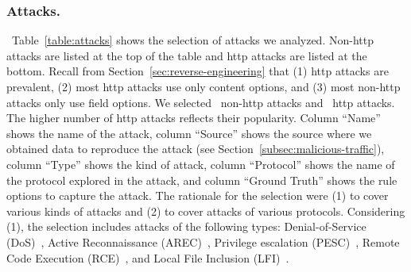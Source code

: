 \documentclass[sigconf,review, anonymous]{acmart}
\begin{document}
\subsubsection{Attacks.}~Table~\ref{table:attacks} shows the selection
of attacks we analyzed.  Non-http attacks are listed at the top of the
table and http attacks are listed at the bottom. Recall from
Section~\ref{sec:reverse-engineering} that (1) http attacks are
prevalent, (2) most http attacks use only content options, and (3)
most non-http attacks only use field options. We selected
\numNonContentAttacks\ non-http attacks and \numContentAttacks\ http
attacks. The higher number of http attacks reflects their
popularity. Column ``Name'' shows the name of the attack, column
``Source'' shows the source where we obtained data to reproduce the
attack (see Section~\ref{subsec:malicious-traffic}), column ``Type''
shows the kind of attack, column ``Protocol'' shows the name of the
protocol explored in the attack, and column ``Ground Truth'' shows the
rule options to capture the attack. The rationale for the selection
were (1) to cover various kinds of attacks and (2) to cover attacks of
various protocols. Considering (1), the selection includes attacks of
the following types: Denial-of-Service (DoS)~\cite{denial-of-service},
Active Reconnaissance (AREC)~\cite{active-reconnaissance}, Privilege
escalation (PESC)~\cite{privilege-escalation}, Remote Code Execution
(RCE)~\cite{remote-code-execution}, and Local File Inclusion
(LFI)~\cite{local-file-inclusion}.


\vspace{1ex}
\end{document}
